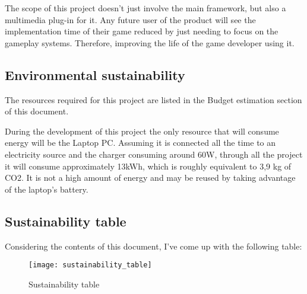 The scope of this project doesn't just involve the main framework, but also a multimedia 
plug-in for it. Any future user of the product will see the implementation time of 
their game reduced by just needing to focus on the gameplay systems. Therefore, improving 
the life of the game developer using it.

\subsection{Environmental sustainability}

The resources required for this project are listed in the Budget estimation section 
of this document.

During the development of this project the only resource that will consume energy 
will be the Laptop PC. Assuming it is connected all the time to an electricity source 
and the charger consuming around 60W, through all the project it will consume approximately 
13kWh, which is roughly equivalent to 3,9 kg of CO2\cite{CO2}. It is not a high amount 
of energy and may be reused by taking advantage of the laptop's battery.

\subsection{Sustainability table}

Considering the contents of this document, I've come up with the following table:

\begin{figure}[H]
    \centering
    \texttt{[image: sustainability\_table]}
    \caption{Sustainability table}
    \label{fig:sustainability_table}
\end{figure}
